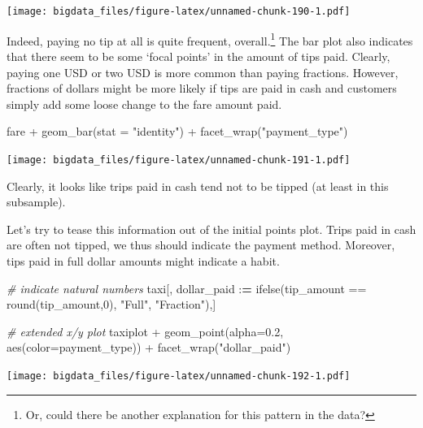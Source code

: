 \documentclass[
  12pt,
]{style/krantz}
\newenvironment{Shaded}{\begin{snugshade}}{\end{snugshade}}
\newcommand{\AttributeTok}[1]{\textcolor[rgb]{0.77,0.63,0.00}{#1}}
\newcommand{\CommentTok}[1]{\textcolor[rgb]{0.56,0.35,0.01}{\textit{#1}}}
\newcommand{\DecValTok}[1]{\textcolor[rgb]{0.00,0.00,0.81}{#1}}
\newcommand{\ErrorTok}[1]{\textcolor[rgb]{0.64,0.00,0.00}{\textbf{#1}}}
\newcommand{\FloatTok}[1]{\textcolor[rgb]{0.00,0.00,0.81}{#1}}
\newcommand{\FunctionTok}[1]{\textcolor[rgb]{0.00,0.00,0.00}{#1}}
\newcommand{\NormalTok}[1]{#1}
\newcommand{\SpecialCharTok}[1]{\textcolor[rgb]{0.00,0.00,0.00}{#1}}
\newcommand{\StringTok}[1]{\textcolor[rgb]{0.31,0.60,0.02}{#1}}
\begin{document}
\texttt{[image: bigdata\_files/figure-latex/unnamed-chunk-190-1.pdf]}

Indeed, paying no tip at all is quite frequent, overall.\footnote{Or, could there be another explanation for this pattern in the data?} The bar plot also indicates that there seem to be some `focal points' in the amount of tips paid. Clearly, paying one USD or two USD is more common than paying fractions. However, fractions of dollars might be more likely if tips are paid in cash and customers simply add some loose change to the fare amount paid.

\begin{Shaded}
\begin{Highlighting}[]
\NormalTok{fare }\SpecialCharTok{+} \FunctionTok{geom\_bar}\NormalTok{(}\AttributeTok{stat =} \StringTok{"identity"}\NormalTok{) }\SpecialCharTok{+} 
     \FunctionTok{facet\_wrap}\NormalTok{(}\StringTok{"payment\_type"}\NormalTok{) }
\end{Highlighting}
\end{Shaded}

\texttt{[image: bigdata\_files/figure-latex/unnamed-chunk-191-1.pdf]}

Clearly, it looks like trips paid in cash tend not to be tipped (at least in this subsample).

Let's try to tease this information out of the initial points plot. Trips paid in cash are often not tipped, we thus should indicate the payment method. Moreover, tips paid in full dollar amounts might indicate a habit.

\begin{Shaded}
\begin{Highlighting}[]
\CommentTok{\# indicate natural numbers}
\NormalTok{taxi[, dollar\_paid }\SpecialCharTok{:}\ErrorTok{=} \FunctionTok{ifelse}\NormalTok{(tip\_amount }\SpecialCharTok{==} \FunctionTok{round}\NormalTok{(tip\_amount,}\DecValTok{0}\NormalTok{), }\StringTok{"Full"}\NormalTok{, }\StringTok{"Fraction"}\NormalTok{),]}


\CommentTok{\# extended x/y plot}
\NormalTok{taxiplot }\SpecialCharTok{+}
     \FunctionTok{geom\_point}\NormalTok{(}\AttributeTok{alpha=}\FloatTok{0.2}\NormalTok{, }\FunctionTok{aes}\NormalTok{(}\AttributeTok{color=}\NormalTok{payment\_type)) }\SpecialCharTok{+}
     \FunctionTok{facet\_wrap}\NormalTok{(}\StringTok{"dollar\_paid"}\NormalTok{)}
\end{Highlighting}
\end{Shaded}

\texttt{[image: bigdata\_files/figure-latex/unnamed-chunk-192-1.pdf]}
\end{document}

